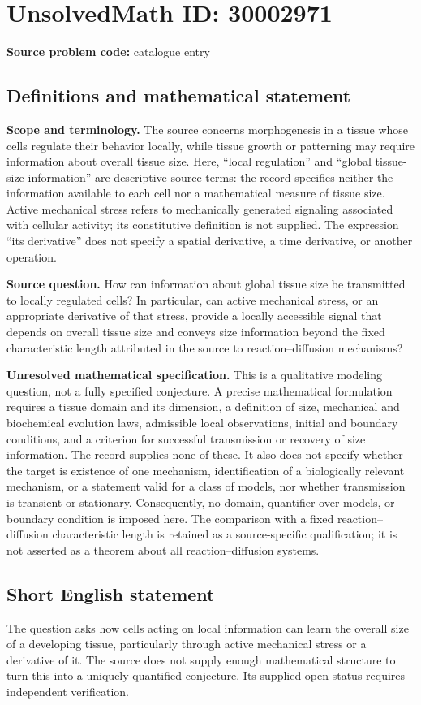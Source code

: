 \documentclass[11pt]{article}
\begin{document}
\section*{UnsolvedMath ID: 30002971}
\textbf{Source problem code:} catalogue entry
\subsection{Definitions and mathematical statement}
\textbf{Scope and terminology.} The source concerns morphogenesis in a tissue whose cells regulate their behavior locally, while tissue growth or patterning may require information about overall tissue size. Here, ``local regulation'' and ``global tissue-size information'' are descriptive source terms: the record specifies neither the information available to each cell nor a mathematical measure of tissue size. Active mechanical stress refers to mechanically generated signaling associated with cellular activity; its constitutive definition is not supplied. The expression ``its derivative'' does not specify a spatial derivative, a time derivative, or another operation.

\textbf{Source question.} How can information about global tissue size be transmitted to locally regulated cells? In particular, can active mechanical stress, or an appropriate derivative of that stress, provide a locally accessible signal that depends on overall tissue size and conveys size information beyond the fixed characteristic length attributed in the source to reaction--diffusion mechanisms?

\textbf{Unresolved mathematical specification.} This is a qualitative modeling question, not a fully specified conjecture. A precise mathematical formulation requires a tissue domain and its dimension, a definition of size, mechanical and biochemical evolution laws, admissible local observations, initial and boundary conditions, and a criterion for successful transmission or recovery of size information. The record supplies none of these. It also does not specify whether the target is existence of one mechanism, identification of a biologically relevant mechanism, or a statement valid for a class of models, nor whether transmission is transient or stationary. Consequently, no domain, quantifier over models, or boundary condition is imposed here. The comparison with a fixed reaction--diffusion characteristic length is retained as a source-specific qualification; it is not asserted as a theorem about all reaction--diffusion systems.
\subsection{Short English statement}
The question asks how cells acting on local information can learn the overall size of a developing tissue, particularly through active mechanical stress or a derivative of it. The source does not supply enough mathematical structure to turn this into a uniquely quantified conjecture. Its supplied open status requires independent verification.
\end{document}
